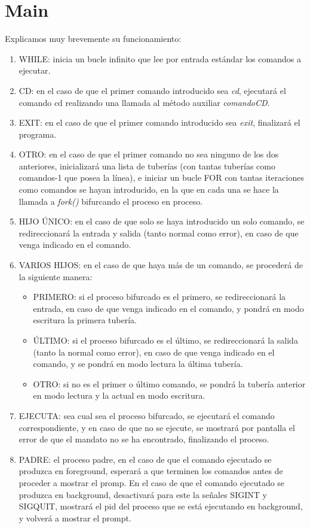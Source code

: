\section{Main}
Explicamos muy brevemente su funcionamiento:
\begin{enumerate}
 \item WHILE: inicia un bucle infinito que lee por entrada estándar los comandos a ejecutar.
 \item CD: en el caso de que el primer comando introducido sea \textit{cd}, ejecutará el comando cd realizando una llamada al método auxiliar \textit{comandoCD}.
 \item EXIT: en el caso de que el primer comando introducido sea \textit{exit}, finalizará el programa.
 \item OTRO: en el caso de que el primer comando no sea ninguno de los dos anteriores, inicializará una lista de tuberías (con tantas tuberías como comandos-1 que posea la línea), e iniciar un bucle FOR con tantas iteraciones como comandos se hayan introducido, en la que en cada una se hace la llamada a \textit{fork()} bifurcando el proceso en proceso.
 \item HIJO ÚNICO: en el caso de que solo se haya introducido un solo comando, se redireccionará la entrada y salida (tanto normal como error), en caso de que venga indicado en el comando.
 \item VARIOS HIJOS: en el caso de que haya más de un comando, se procederá de la siguiente manera:
 \begin{itemize}
  \item PRIMERO: si el proceso bifurcado es el primero, se redireccionará la entrada, en caso de que venga indicado en el comando, y pondrá en modo escritura la primera tubería.
  \item ÚLTIMO: si el proceso bifurcado es el último, se redireccionará la salida (tanto la normal como error), en caso de que venga indicado en el comando, y se pondrá en modo lectura la última tubería.
  \item OTRO: si no es el primer o último comando, se pondrá la tubería anterior en modo lectura y la actual en modo escritura.
 \end{itemize}
 \item EJECUTA: sea cual sea el proceso bifurcado, se ejecutará el comando correspondiente, y en caso de que no se ejecute, se mostrará por pantalla el error de que el mandato no se ha encontrado, finalizando el proceso.
 \item PADRE: el proceso padre, en el caso de que el comando ejecutado se produzca en foreground, esperará a que terminen los comandos antes de proceder a mostrar el promp. En el caso de que el comando ejecutado se produzca en background, desactivará para este la señales SIGINT y SIGQUIT, mostrará el pid del proceso que se está ejecutando en background, y volverá a mostrar el prompt.
\end{enumerate}
